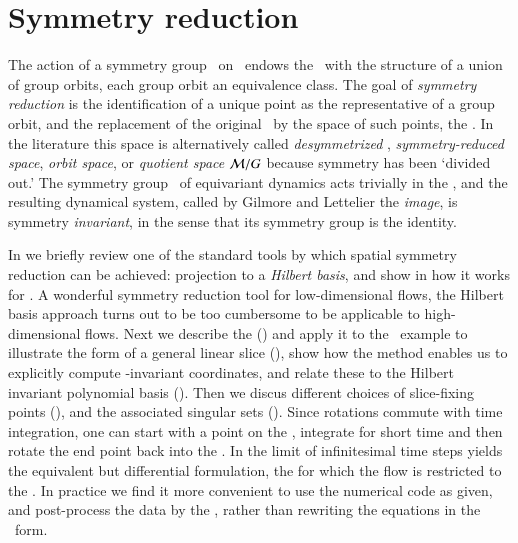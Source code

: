 \documentclass[preprint,number,sort&compress]{elsarticle}
\begin{document}
\section{\label{s:symmRed} Symmetry reduction}

The action of a symmetry group \Group\ on \pS\ endows the
\statesp\ with the structure of a union of group orbits, each
group orbit an equivalence class. The goal of {\em symmetry
reduction} is the identification of a unique point as the
representative of a group orbit, and the replacement of the
original \statesp\ by the space of such points, the {\em
\reducedsp}. In the literature this space is alternatively
called
\emph{desymmetrized \statesp},
\emph{symmetry-reduced space},
\emph{orbit space}, or \emph{quotient space}
${\cal M}/G$ because symmetry has been `divided out.' {The}
symmetry group \Group\ of equivariant dynamics acts trivially
in {the} \reducedsp, and the resulting dynamical system,
called by Gilmore and Lettelier the
\emph{image}, is symmetry {\em invariant}, in the sense that
its symmetry group is the identity.

In  we briefly review one of the standard
tools by which spatial symmetry reduction can be achieved:
projection to a \emph{Hilbert basis}, and show in
 how it works for \cLf. A wonderful
symmetry reduction tool for low-dimensional flows, the
Hilbert basis approach turns out to be too cumbersome to be
applicable to high-dimensional flows. Next we describe the
\emph{\mframes} () and apply it to the \cLf\
example to illustrate the form of a general linear slice
(), show how the method enables us
to explicitly compute \Group-invariant coordinates, and
relate these to the Hilbert invariant polynomial basis
(). Then we discus different choices
of slice-fixing points (), and the
associated singular sets ().
Since rotations commute with time integration, one can
start with a point on the \slice,
integrate for short time and then rotate the
end point back into the \slice.
In  the limit of
infinitesimal time steps yields the equivalent but differential
formulation, the \emph{\mslices} for which the flow is restricted to
the \reducedsp.
In practice we find it more convenient to use the
numerical code as given, and post-process the data by the \mframes,
rather than rewriting the equations in the \mslices\ form.
\end{document}
